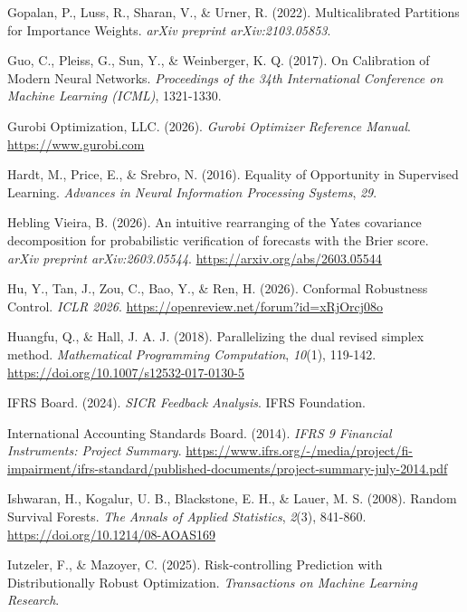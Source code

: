 \documentclass[
  spanish,
  11pt,
  letterpaper,
]{scrbook}
\newlength{\cslhangindent}
\newenvironment{CSLReferences}[2] %
 {\begin{list}{}{%
  \setlength{\itemindent}{0pt}
  \setlength{\leftmargin}{0pt}
  \setlength{\parsep}{0pt}
  \ifodd #1
   \setlength{\leftmargin}{\cslhangindent}
   \setlength{\itemindent}{-1\cslhangindent}
  \fi
  \setlength{\itemsep}{#2\baselineskip}}}
 {\end{list}}
\theoremstyle{plain}
\theoremstyle{remark}
\begin{document}
\begin{CSLReferences}{1}{0}
Gopalan, P., Luss, R., Sharan, V., \& Urner, R. (2022). Multicalibrated
Partitions for Importance Weights. \emph{arXiv preprint
arXiv:2103.05853}.

Guo, C., Pleiss, G., Sun, Y., \& Weinberger, K. Q. (2017). On
Calibration of Modern Neural Networks. \emph{Proceedings of the 34th
International Conference on Machine Learning (ICML)}, 1321-1330.

Gurobi Optimization, LLC. (2026). \emph{{Gurobi Optimizer Reference
Manual}}. \url{https://www.gurobi.com}

Hardt, M., Price, E., \& Srebro, N. (2016). Equality of Opportunity in
Supervised Learning. \emph{Advances in Neural Information Processing
Systems}, \emph{29}.

Hebling Vieira, B. (2026). An intuitive rearranging of the Yates
covariance decomposition for probabilistic verification of forecasts
with the Brier score. \emph{arXiv preprint arXiv:2603.05544}.
\url{https://arxiv.org/abs/2603.05544}

Hu, Y., Tan, J., Zou, C., Bao, Y., \& Ren, H. (2026). Conformal
Robustness Control. \emph{ICLR 2026}.
\url{https://openreview.net/forum?id=xRjOrcj08o}

Huangfu, Q., \& Hall, J. A. J. (2018). Parallelizing the dual revised
simplex method. \emph{Mathematical Programming Computation},
\emph{10}(1), 119-142. \url{https://doi.org/10.1007/s12532-017-0130-5}

IFRS Board. (2024). \emph{{SICR} Feedback Analysis}. IFRS Foundation.

International Accounting Standards Board. (2014). \emph{IFRS 9 Financial
Instruments: Project Summary}.
\url{https://www.ifrs.org/-/media/project/fi-impairment/ifrs-standard/published-documents/project-summary-july-2014.pdf}

Ishwaran, H., Kogalur, U. B., Blackstone, E. H., \& Lauer, M. S. (2008).
Random Survival Forests. \emph{The Annals of Applied Statistics},
\emph{2}(3), 841-860. \url{https://doi.org/10.1214/08-AOAS169}

Iutzeler, F., \& Mazoyer, C. (2025). Risk-controlling Prediction with
Distributionally Robust Optimization. \emph{Transactions on Machine
Learning Research}.


\end{CSLReferences}
\end{document}

